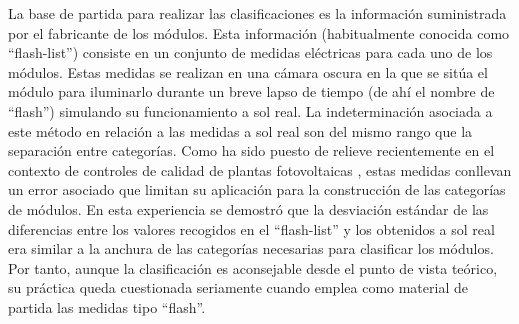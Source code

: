 La base de partida para realizar las clasificaciones es la información
suministrada por el fabricante de los módulos. Esta información (habitualmente
conocida como {}``flash-list'') consiste en un conjunto de medidas
eléctricas para cada uno de los módulos. Estas medidas se realizan
en una cámara oscura en la que se sitúa el módulo para iluminarlo
durante un breve lapso de tiempo (de ahí el nombre de {}``flash'')
simulando su funcionamiento a sol real. La indeterminación asociada
a este método en relación a las medidas a sol real son del mismo rango
que la separación entre categorías. Como ha sido puesto de relieve
recientemente en el contexto de controles de calidad de plantas fotovoltaicas
\citep{Lorenzo.Moreton.ea2008}, estas medidas conllevan un error
asociado que limitan su aplicación para la construcción de las categorías
de módulos. En esta experiencia se demostró que la desviación estándar
de las diferencias entre los valores recogidos en el {}``flash-list''
y los obtenidos a sol real era similar a la anchura de las categorías
necesarias para clasificar los módulos. Por tanto, aunque la clasificación
es aconsejable desde el punto de vista teórico, su práctica queda
cuestionada seriamente cuando emplea como material de partida las
medidas tipo {}``flash''.

